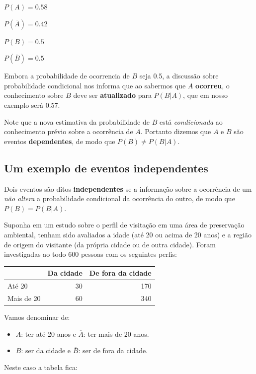\documentclass[
]{book}
\begin{document}
\(P(A) = 0.58\)

\(P(\overline{A}) = 0.42\)

\(P(B) = 0.5\)

\(P(\overline{B}) = 0.5\)

Embora a probabilidade de ocorrencia de \(B\) seja 0.5, a discussão sobre probabilidade condicional nos informa que ao sabermos que \(A\) \textbf{ocorreu}, o conhecimento sobre \(B\) deve ser \textbf{atualizado} para \(P(B|A)\), que em nosso exemplo será 0.57.

Note que a nova estimativa da probabilidade de \(B\) está \emph{condicionada} ao conhecimento prévio sobre a ocorrência de \(A\). Portanto dizemos que \(A\) e \(B\) são eventos \textbf{dependentes}, de modo que \(P(B) \neq P(B|A)\).

\hypertarget{um-exemplo-de-eventos-independentes}{%
\subsection{Um exemplo de eventos independentes}\label{um-exemplo-de-eventos-independentes}}

Dois eventos são ditos \textbf{independentes} se a informação sobre a ocorrência de um \emph{não altera} a probabilidade condicional da ocorrência do outro, de modo que \(P(B) = P(B|A)\).

Suponha em um estudo sobre o perfil de visitação em uma área de preservação ambiental, tenham sido avaliados a idade (até 20 ou acima de 20 anos) e a região de origem do visitante (da própria cidade ou de outra cidade). Foram investigadas ao todo 600 pessoas com os seguintes perfis:

\begin{tabular}{l|r|r}
\hline
  & Da cidade & De fora da cidade\\
\hline
Até 20 & 30 & 170\\
\hline
Mais de 20 & 60 & 340\\
\hline
\end{tabular}

Vamos denominar de:

\begin{itemize}
\item
  \(A\): ter até 20 anos e \(\overline{A}\): ter mais de 20 anos.
\item
  \(B\): ser da cidade e \(\overline{B}\): ser de fora da cidade.
\end{itemize}

Neste caso a tabela fica:
\end{document}
